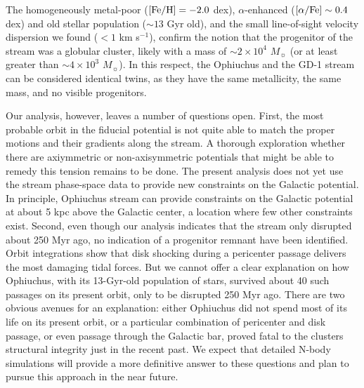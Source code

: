 \documentclass[iop]{emulateapj}
\begin{document}
The homogeneously metal-poor (${\rm [Fe/H]}=-2.0$ dex), $\alpha$-enhanced
(${\rm [\alpha/Fe]\sim0.4}$ dex) and old stellar population ($\sim13$ Gyr old),
and the small line-of-sight velocity dispersion we found ($<1$ km s$^{-1}$),
confirm the notion that the progenitor of the stream was a globular cluster,
likely with a mass of $\sim2\times10^4$ $M_\sun$ (or at least greater than
$\sim4\times10^3$ $M_\sun$). In this respect, the Ophiuchus and the GD-1 stream
\citep{gd06, kop10} can be considered identical twins, as they have the same
metallicity, the same mass, and no visible progenitors.

Our analysis, however, leaves a number of questions open. First, the most
probable orbit in the fiducial potential is not quite able to match the proper
motions and their gradients along the stream. A thorough exploration whether
there are axiymmetric or non-axisymmetric potentials that might be able to
remedy this tension remains to be done. The present analysis does not yet use
the stream phase-space data to provide new constraints on the Galactic
potential. In principle, Ophiuchus stream can provide constraints on the
Galactic potential at about 5 kpc above the Galactic center, a location where
few other constraints exist. Second, even though our analysis indicates that the
stream only disrupted about 250 Myr ago, no indication of a progenitor remnant
have been identified. Orbit integrations show that disk shocking during a
pericenter passage delivers the most damaging tidal forces. But we cannot offer 
a clear explanation on how Ophiuchus, with its 13-Gyr-old population of stars,
survived about 40 such passages on its present orbit, only to be disrupted 250
Myr ago. There are two obvious avenues for an explanation: either Ophiuchus did 
not spend most of its life on its present orbit, or a particular combination of 
pericenter and disk passage, or even passage through the Galactic bar, proved
fatal to the clusters structural integrity just in the recent past. We expect
that detailed N-body simulations will provide a more definitive answer to these 
questions and plan to pursue this approach in the near future.

\acknowledgments
\end{document}
